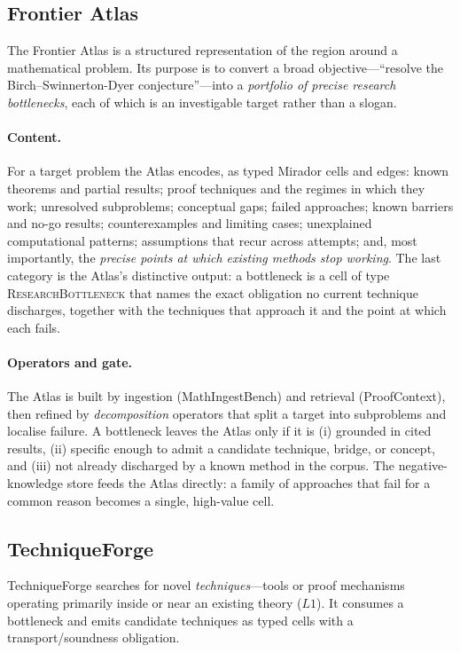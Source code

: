 \documentclass[11pt]{article}
\theoremstyle{definition}
\theoremstyle{remark}
\newcommand{\ntype}[1]{\textsc{#1}}
\begin{document}
\subsection{Frontier Atlas}
\label{sec:atlas}

The Frontier Atlas is a structured representation of the region around a mathematical problem. Its
purpose is to convert a broad objective---``resolve the Birch--Swinnerton-Dyer conjecture''---into a
\emph{portfolio of precise research bottlenecks}, each of which is an investigable target rather than
a slogan.

\paragraph{Content.} For a target problem the Atlas encodes, as typed Mirador cells and edges:
known theorems and partial results; proof techniques and the regimes in which they work;
unresolved subproblems; conceptual gaps; failed approaches; known barriers and no-go results;
counterexamples and limiting cases; unexplained computational patterns; assumptions that recur across
attempts; and, most importantly, the \emph{precise points at which existing methods stop working}.
The last category is the Atlas's distinctive output: a bottleneck is a cell of type
\ntype{ResearchBottleneck} that names the exact obligation no current technique discharges, together
with the techniques that approach it and the point at which each fails.

\paragraph{Operators and gate.} The Atlas is built by ingestion (MathIngestBench) and retrieval
(ProofContext), then refined by \emph{decomposition} operators that split a target into subproblems
and localise failure. A bottleneck leaves the Atlas only if it is (i) grounded in cited results,
(ii) specific enough to admit a candidate technique, bridge, or concept, and (iii) not already
discharged by a known method in the corpus. The negative-knowledge store feeds the Atlas directly:
a family of approaches that fail for a common reason becomes a single, high-value cell.

\subsection{TechniqueForge}
\label{sec:techniqueforge}

TechniqueForge searches for novel \emph{techniques}---tools or proof mechanisms operating primarily
inside or near an existing theory ($L1$). It consumes a bottleneck and emits candidate techniques as
typed cells with a transport/soundness obligation.
\end{document}
